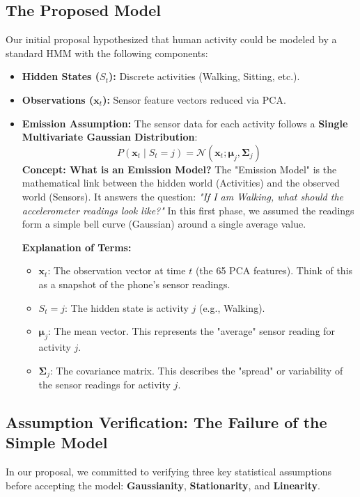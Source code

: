 \documentclass[11pt,a4paper]{article}
\newcommand{\bx}{\mathbf{x}}
\newcommand{\bmu}{\boldsymbol{\mu}}
\newcommand{\bSigma}{\boldsymbol{\Sigma}}
\begin{document}
\subsection{The Proposed Model}
Our initial proposal hypothesized that human activity could be modeled by a standard HMM with the following components:
\begin{itemize}
    \item \textbf{Hidden States ($S_t$):} Discrete activities (Walking, Sitting, etc.).
    \item \textbf{Observations ($\bx_t$):} Sensor feature vectors reduced via PCA.
    \item \textbf{Emission Assumption:} The sensor data for each activity follows a \textbf{Single Multivariate Gaussian Distribution}:
    $$ P(\bx_t \mid S_t = j) = \mathcal{N}(\bx_t; \bmu_j, \bSigma_j) $$
    \textbf{Concept: What is an Emission Model?}
    The "Emission Model" is the mathematical link between the hidden world (Activities) and the observed world (Sensors). It answers the question: \textit{"If I am Walking, what should the accelerometer readings look like?"}
    In this first phase, we assumed the readings form a simple bell curve (Gaussian) around a single average value.

    \textbf{Explanation of Terms:}
    \begin{itemize}
        \item $\bx_t$: The observation vector at time $t$ (the 65 PCA features). Think of this as a snapshot of the phone's sensor readings.
        \item $S_t = j$: The hidden state is activity $j$ (e.g., Walking).
        \item $\bmu_j$: The mean vector. This represents the "average" sensor reading for activity $j$.
        \item $\bSigma_j$: The covariance matrix. This describes the "spread" or variability of the sensor readings for activity $j$.
    \end{itemize}
\end{itemize}

\subsection{Assumption Verification: The Failure of the Simple Model}
In our proposal, we committed to verifying three key statistical assumptions before accepting the model: \textbf{Gaussianity}, \textbf{Stationarity}, and \textbf{Linearity}.
\end{document}
